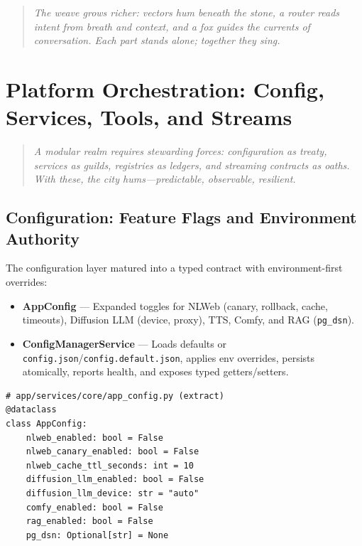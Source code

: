 \documentclass[11pt]{article}
\begin{document}
\begin{quote}
\emph{The weave grows richer: vectors hum beneath the stone, a router reads intent from breath and context, and a fox guides the currents of conversation. Each part stands alone; together they sing.}
\end{quote}

\vspace{1em}

\section{Platform Orchestration: Config, Services, Tools, and Streams}

\begin{quote}
\emph{A modular realm requires stewarding forces: configuration as treaty, services as guilds, registries as ledgers, and streaming contracts as oaths. With these, the city hums—predictable, observable, resilient.}
\end{quote}

\subsection{Configuration: Feature Flags and Environment Authority}

The configuration layer matured into a typed contract with environment-first overrides:

\begin{itemize}
  \item \textbf{AppConfig} — Expanded toggles for NLWeb (canary, rollback, cache, timeouts), Diffusion LLM (device, proxy), TTS, Comfy, and RAG (\texttt{pg\_dsn}).
  \item \textbf{ConfigManagerService} — Loads defaults or \texttt{config.json}/\texttt{config.default.json}, applies env overrides, persists atomically, reports health, and exposes typed getters/setters.
\end{itemize}

\begin{lstlisting}[style=python]
# app/services/core/app_config.py (extract)
@dataclass
class AppConfig:
    nlweb_enabled: bool = False
    nlweb_canary_enabled: bool = False
    nlweb_cache_ttl_seconds: int = 10
    diffusion_llm_enabled: bool = False
    diffusion_llm_device: str = "auto"
    comfy_enabled: bool = False
    rag_enabled: bool = False
    pg_dsn: Optional[str] = None
\end{lstlisting}
\end{document}

